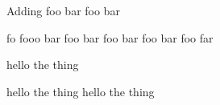 Adding foo bar foo bar

fo fooo bar foo bar foo bar foo bar foo far

hello the thing

hello the thing hello the thing